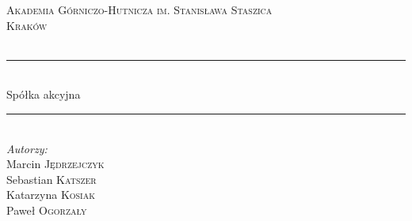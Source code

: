 \documentclass[a4paper, 11pt]{article}
\begin{document}
	
	\begin{titlepage}
	
	
		
		\newcommand{\HRule}{\rule{\linewidth}{0.5mm}} %
		
		\center %
		
		
		\textsc{\LARGE Akademia Górniczo-Hutnicza im. Stanisława Staszica}\\[1.5cm] %
		\textsc{\Large Kraków}\\[0.5cm] %
		\textsc{\large }\\[0.5cm] %
		
		
		\HRule \\[0.4cm]
		{\fontsize{38}{50}\selectfont Spółka akcyjna}
		\HRule \\[1.5cm]
		
		
		\Large \emph{Autorzy:}\\
		Marcin \textsc{Jędrzejczyk}\\ %
		Sebastian \textsc{Katszer}\\ %
		Katarzyna \textsc{Kosiak} \\ %
		Paweł	  \textsc{Ogorzały} \\ [3cm]\


\end{titlepage}
\end{document}
